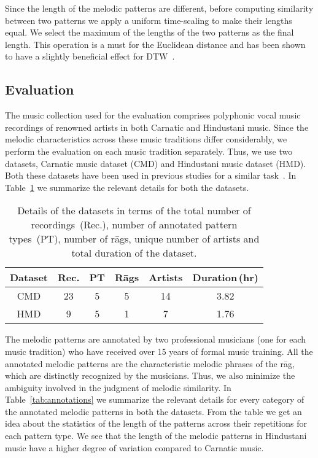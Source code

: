Since the length of the melodic patterns are different, before computing similarity between two patterns we apply  a uniform time-scaling to make their lengths equal. We select the maximum of the lengths of the two patterns as the final length. This operation is a must for the Euclidean distance and has been shown to have a slightly beneficial effect for DTW~\cite{Ratanamahatana2004}.

\subsection{Evaluation}

The music collection used for the evaluation comprises polyphonic vocal music recordings of renowned artists in both Carnatic and Hindustani music. Since the melodic characteristics across these music traditions differ considerably, we perform the evaluation on each music tradition separately. Thus, we use two datasets, Carnatic music dataset (CMD) and Hindustani music dataset (HMD). Both these datasets have been used in previous studies for a similar task~\cite{Ishwar2013, Ross2012b, Rao2014}. In Table~\ref{tab:datasetDetails} we summarize the relevant details for both the datasets. 

\begin{table} 
	\centering
	\begin{tabular}{ c | c c c c c}
		\hline\hline
		Dataset   	& 	Rec. 	&	PT		&	R\={a}gs	&	Artists		&	Duration\,(hr)\\	
		\hline
		CMD   	& 	23 	&	5		&	5 	&	14		&	3.82\\	
		
		HMD   	& 	9 	&	5		&	1	&	7		&	1.76\\	
		\hline\hline
		
	\end{tabular}
	\caption{Details of the datasets in terms of the total number of recordings~(Rec.), number of annotated pattern types~(PT), number of r\={a}gs, unique number of artists and total duration of the dataset.}
	\label{tab:datasetDetails}
\end{table}


The melodic patterns are annotated by two professional musicians (one for each music tradition) who have received over 15 years of formal music training. All the annotated melodic patterns are the characteristic melodic phrases of the r\={a}g, which are distinctly recognized by the musicians. Thus, we also minimize the ambiguity involved in the judgment of melodic similarity. In Table~\ref{tab:annotations} we summarize the relevant details for every category of the annotated melodic patterns in both the datasets. From the table we get an idea about the statistics of the length of the patterns across their repetitions for each pattern type. We see that the length of the melodic patterns in Hindustani music have a higher degree of variation compared to Carnatic music.

